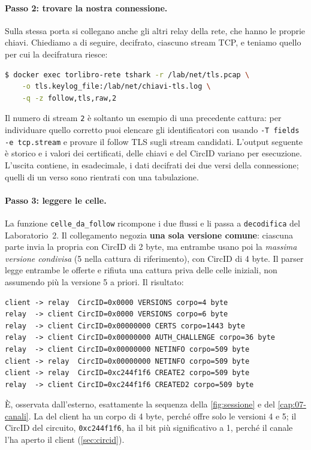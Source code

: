 \paragraph{Passo 2: trovare la nostra connessione.} Sulla stessa porta si collegano anche gli altri relay della rete, che hanno le proprie chiavi. Chiediamo a  di seguire, decifrato, ciascuno stream TCP, e teniamo quello per cui la decifratura riesce:
\begin{lstlisting}[language=bash,numbers=none]
$ docker exec torlibro-rete tshark -r /lab/net/tls.pcap \
    -o tls.keylog_file:/lab/net/chiavi-tls.log \
    -q -z follow,tls,raw,2
\end{lstlisting}
Il numero di stream \texttt{2} è soltanto un esempio di una precedente cattura: per individuare quello corretto puoi elencare gli identificatori con  usando \texttt{-T fields -e tcp.stream} e provare il follow TLS sugli stream candidati. L'output seguente è storico e i valori dei certificati, delle chiavi e del CircID variano per esecuzione.
L'uscita contiene, in esadecimale, i dati decifrati dei due versi della connessione; quelli di un verso sono rientrati con una tabulazione.

\paragraph{Passo 3: leggere le celle.} La funzione \texttt{celle\_da\_follow} ricompone i due flussi e li passa a \texttt{decodifica} del Laboratorio~2. Il collegamento negozia \textbf{una sola versione comune}: ciascuna parte invia la propria  con CircID di 2 byte, ma entrambe usano poi la \emph{massima versione condivisa} (5 nella cattura di riferimento), con CircID di 4 byte. Il parser legge entrambe le offerte e rifiuta una cattura priva delle celle iniziali, non assumendo più la versione 5 a priori. Il risultato:
\begin{lstlisting}[numbers=none]
client -> relay  CircID=0x0000 VERSIONS corpo=4 byte
relay  -> client CircID=0x0000 VERSIONS corpo=6 byte
relay  -> client CircID=0x00000000 CERTS corpo=1443 byte
relay  -> client CircID=0x00000000 AUTH_CHALLENGE corpo=36 byte
relay  -> client CircID=0x00000000 NETINFO corpo=509 byte
client -> relay  CircID=0x00000000 NETINFO corpo=509 byte
client -> relay  CircID=0xc244f1f6 CREATE2 corpo=509 byte
relay  -> client CircID=0xc244f1f6 CREATED2 corpo=509 byte
\end{lstlisting}
È, osservata dall'esterno, esattamente la sequenza della \cref{fig:sessione} e del \cref{cap:07-canali}. La  del client ha un corpo di 4 byte, perché  offre solo le versioni 4 e 5; il CircID del circuito, \texttt{0xc244f1f6}, ha il bit più significativo a 1, perché il canale l'ha aperto il client (\cref{sec:circid}).

